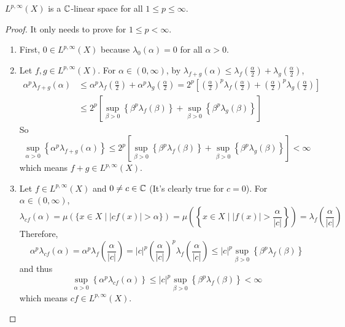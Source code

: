 \begin{prop}
	$L^{p,\infty}(X)$ is a $\mathbb{C}$-linear space for all $1 \leq p \leq \infty$.
\end{prop}
\begin{proof}
	It only needs to prove for $1 \leq p < \infty$.
	\begin{enumerate}[label=(\arabic{*})]
		\item First, $0 \in L^{p,\infty}(X)$ because $\lambda_0(\alpha) = 0$ for all $\alpha > 0$.
		\item Let $f,g \in L^{p,\infty}(X)$. For $\alpha \in (0,\infty)$, by $\lambda_{f+g}(\alpha) \leq \lambda_f\left(\frac{\alpha}{2}\right)+\lambda_g\left(\frac{\alpha}{2}\right)$,
		\begin{equation*}
			\begin{aligned}
				\alpha^p \lambda_{f+g}(\alpha) & \leq \alpha^p \lambda_f\left(\frac{\alpha}{2}\right)+\alpha^p \lambda_g\left(\frac{\alpha}{2}\right)=2^p\left[\left(\frac{\alpha}{2}\right)^p \lambda_f\left(\frac{\alpha}{2}\right)+\left(\frac{\alpha}{2}\right)^p \lambda_g\left(\frac{\alpha}{2}\right)\right] \\
				& \leq 2^p\left[\sup _{\beta>0}\left\{\beta^p \lambda_f(\beta)\right\}+\sup _{\beta>0}\left\{\beta^p \lambda_g(\beta)\right\}\right]
			\end{aligned}
		\end{equation*}
		So
		\begin{equation*}
			\sup _{\alpha>0}\left\{\alpha^p \lambda_{f+g}(\alpha)\right\} \leq 2^p\left[\sup _{\beta>0}\left\{\beta^p \lambda_f(\beta)\right\}+\sup _{\beta>0}\left\{\beta^p \lambda_g(\beta)\right\}\right]<\infty
		\end{equation*}
		which means $f+g \in L^{p, \infty}(X)$.

		\item Let $f\in L^{p,\infty}(X)$ and $0 \neq c \in \mathbb{C}$ (It's clearly true for $c=0$). For $\alpha \in (0,\infty)$,
		\begin{equation*}
			\lambda_{c f}(\alpha)=\mu(\{x \in X \mid | c f(x) |>\alpha\})=\mu\left(\left\{x \in X \mid | f(x) |>\frac{\alpha}{|c|}\right\}\right)=\lambda_f\left(\frac{\alpha}{|c|}\right)
		\end{equation*}
		Therefore,
		\begin{equation*}
			\alpha^p \lambda_{c f}(\alpha)=\alpha^p \lambda_f\left(\frac{\alpha}{|c|}\right)=|c|^p\left(\frac{\alpha}{|c|}\right)^p \lambda_f\left(\frac{\alpha}{|c|}\right) \leq|c|^p \sup _{\beta>0}\left\{\beta^p \lambda_f(\beta)\right\}
		\end{equation*}
		and thus
		\begin{equation*}
			\sup _{\alpha>0}\left\{\alpha^p \lambda_{c f}(\alpha)\right\} \leq|c|^p \sup _{\beta>0}\left\{\beta^p \lambda_f(\beta)\right\}<\infty
		\end{equation*}
		which means $cf \in L^{p,\infty}(X)$.
	\end{enumerate}
\end{proof}

